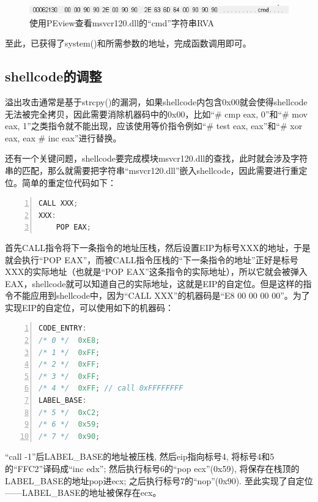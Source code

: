 \documentclass[bachelor]{thesis-uestc}
\begin{document}
\begin{figure}[htbp]
	\centering\includegraphics[width=12cm]{images/libc_cmd_rva.png}
	\caption{使用PEview查看msvcr120.dll的``cmd''字符串RVA}
	\label{fig:libc_cmd_rva}
\end{figure}

至此，已获得了system()和所需参数的地址，完成函数调用即可。

\subsection{shellcode的调整}
溢出攻击通常是基于strcpy()的漏洞，如果shellcode内包含0x00就会使得shellcode无法被完全拷贝，因此需要消除机器码中的0x00，比如``\# cmp eax, 0''和``\# mov eax, 1''之类指令就不能出现，应该使用等价指令例如``\# test eax, eax''和``\# xor eax, eax \# inc eax''进行替换。\par
还有一个关键问题，shellcode要完成模块msvcr120.dll的查找，此时就会涉及字符串的匹配，那么就需要把字符串``msvcr120.dll''嵌入shellcode，因此需要进行重定位。简单的重定位代码如下：

\begin{lstlisting}[language=C++, basicstyle=\ttfamily\tiny, numbers=left, numberstyle=\tiny, keywordstyle=\color{blue!70}, commentstyle=\color{red!50!green!50!blue!50}, frame=shadowbox, rulesepcolor=\color{red!20!green!20!blue!20}]
	CALL XXX;
XXX:
	POP EAX;
\end{lstlisting}

首先CALL指令将下一条指令的地址压栈，然后设置EIP为标号XXX的地址，于是就会执行``POP EAX''，而被CALL指令压栈的``下一条指令的地址''正好是标号XXX的实际地址（也就是``POP EAX''这条指令的实际地址），所以它就会被弹入EAX，shellcode就可以知道自己的实际地址，这就是EIP的自定位。但是这样的指令不能应用到shellcode中，因为``CALL XXX''的机器码是``E8 00 00 00 00''。为了实现EIP的自定位，可以使用如下的机器码：

\begin{lstlisting}[language=C++, basicstyle=\ttfamily\tiny, numbers=left, numberstyle=\tiny, keywordstyle=\color{blue!70}, commentstyle=\color{red!50!green!50!blue!50}, frame=shadowbox, rulesepcolor=\color{red!20!green!20!blue!20}]
CODE_ENTRY:
/* 0 */	 0xE8;
/* 1 */	 0xFF;
/* 2 */	 0xFF;
/* 3 */	 0xFF;
/* 4 */	 0xFF; // call 0xFFFFFFFF
LABEL_BASE:
/* 5 */	 0xC2;
/* 6 */	 0x59;
/* 7 */	 0x90;
\end{lstlisting}

``call -1''后LABEL\_BASE的地址被压栈, 然后eip指向标号4, 将标号4和5的``FFC2''译码成``inc edx''; 然后执行标号6的``pop ecx''(0x59), 将保存在栈顶的LABEL\_BASE的地址pop进ecx; 之后执行标号7的``nop''(0x90). 至此实现了自定位——LABEL\_BASE的地址被保存在ecx。
\end{document}
